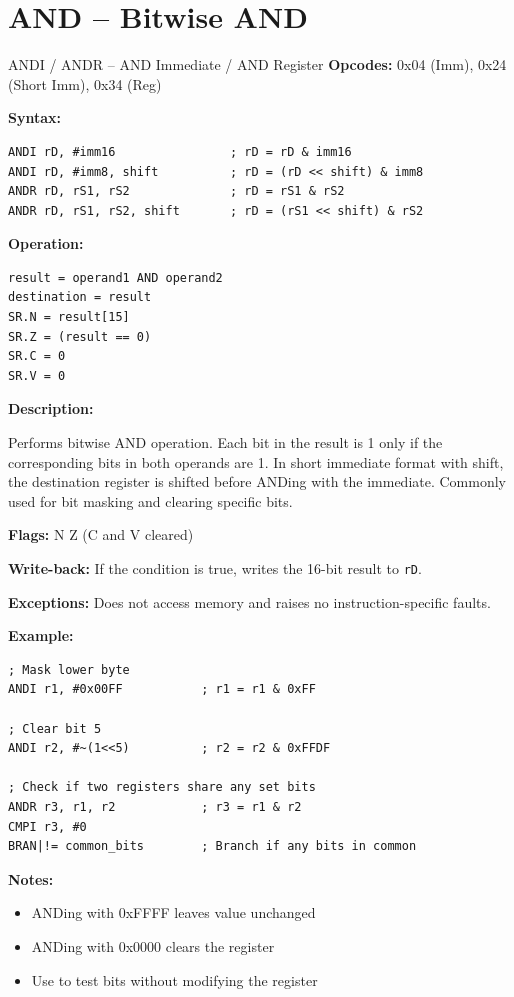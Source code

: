 \section{AND -- Bitwise AND}

\begin{instructionbox}{ANDI / ANDR -- AND Immediate / AND Register}
	\textbf{Opcodes:} 0x04 (Imm), 0x24 (Short Imm), 0x34 (Reg)

	\textbf{Syntax:}
	\begin{lstlisting}
ANDI rD, #imm16                ; rD = rD & imm16
ANDI rD, #imm8, shift          ; rD = (rD << shift) & imm8
ANDR rD, rS1, rS2              ; rD = rS1 & rS2
ANDR rD, rS1, rS2, shift       ; rD = (rS1 << shift) & rS2
\end{lstlisting}

	\textbf{Operation:}
	\begin{verbatim}
result = operand1 AND operand2
destination = result
SR.N = result[15]
SR.Z = (result == 0)
SR.C = 0
SR.V = 0
\end{verbatim}

	\textbf{Description:}

	Performs bitwise AND operation. Each bit in the result is 1 only if the corresponding bits in both operands are 1. In
	short immediate format with shift, the destination register is shifted before ANDing with the immediate. Commonly used
	for bit masking and clearing specific bits.

	\textbf{Flags:} N Z (C and V cleared)

	\textbf{Write-back:} If the condition is true, writes the 16-bit result to \texttt{rD}.

	\textbf{Exceptions:} Does not access memory and raises no instruction-specific faults.

	\textbf{Example:}
	\begin{lstlisting}
; Mask lower byte
ANDI r1, #0x00FF           ; r1 = r1 & 0xFF

; Clear bit 5
ANDI r2, #~(1<<5)          ; r2 = r2 & 0xFFDF

; Check if two registers share any set bits
ANDR r3, r1, r2            ; r3 = r1 & r2
CMPI r3, #0
BRAN|!= common_bits        ; Branch if any bits in common
\end{lstlisting}

	\textbf{Notes:}
	\begin{itemize}
		\item ANDing with 0xFFFF leaves value unchanged
		\item ANDing with 0x0000 clears the register
		\item Use  to test bits without modifying the register
	\end{itemize}
\end{instructionbox}

